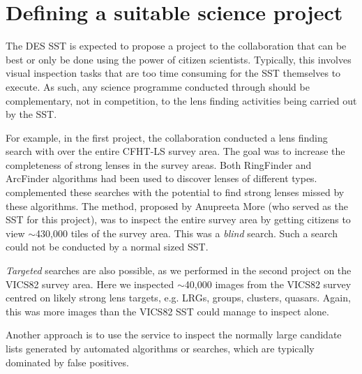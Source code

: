 \documentclass[a4paper,twocolumn]{article}
\begin{document}


\section{Defining a suitable \sw science project}
\label{sec:project}

The DES SST is expected to propose a project to the \SW collaboration that can be best or only be done using the power of citizen scientists. Typically, this involves visual inspection tasks that are too time consuming for the SST themselves to execute. As such, any science programme conducted through \SW should be complementary, not in competition, to the lens finding activities being carried out by the SST.

For example, in the first \SW project, the collaboration conducted a lens finding search with \SW over the entire CFHT-LS survey area. The goal was to increase the completeness of strong lenses in the survey areas. Both RingFinder and ArcFinder algorithms had been used to discover lenses of different types. \SW complemented these searches with the potential to find strong lenses missed by these algorithms. The method, proposed by Anupreeta More (who served as the SST for this project), was to inspect the entire survey area by getting citizens to view $\sim$430,000 tiles of the survey area. This was a \textit{blind} search. Such a search could not be conducted by a normal sized SST.

\textit{Targeted} searches are also possible, as we performed in the second \SW project on the VICS82 survey area. Here we inspected $\sim$40,000 images from the VICS82 survey centred on likely strong lens targets, e.g. LRGs, groups, clusters, quasars.  Again, this was more images than the VICS82 SST could manage to inspect alone.

Another approach is to use the \SW service to inspect the normally large candidate lists generated by automated algorithms or searches, which are typically dominated by false positives.
\end{document}
